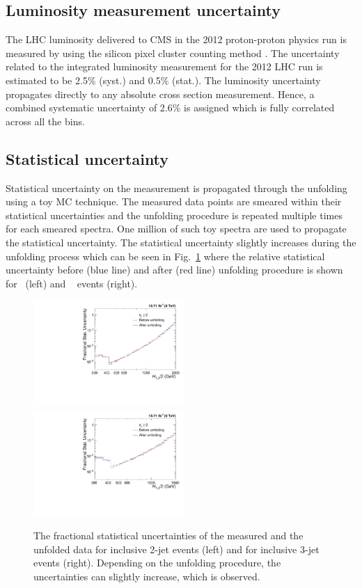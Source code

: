  \subsection{Luminosity measurement uncertainty}
The LHC luminosity delivered to CMS in the 2012 proton-proton physics run is measured  by using the silicon pixel cluster counting method \cite{CMS:2013gfa}. The uncertainty related to the integrated luminosity measurement for the 2012 LHC run is estimated to be 2.5\% (syst.) and 0.5\% (stat.). The luminosity uncertainty propagates directly to any absolute cross section measurement. Hence, a combined systematic uncertainty of 2.6\% is assigned which is fully correlated across all the \httwo bins. 

\subsection{Statistical uncertainty}
\label{sec:unfolding_stat}
Statistical uncertainty on the measurement is propagated through the unfolding using a toy MC technique. The measured data points are smeared within their statistical uncertainties and the unfolding procedure is repeated multiple times for each smeared spectra. One million of such toy spectra are used to propagate the statistical uncertainty. The statistical uncertainty slightly increases during the unfolding process which can be seen in Fig.~\ref{fig:stat_unc} where the relative statistical uncertainty before (blue line) and after (red line) unfolding procedure is shown for \njt~(left) and \njth~ events (right). 

\begin{figure}[h]
 \begin{center}
 \includegraphics[width=0.51\textwidth]{Plots_HT_2_150/Comparison_stat_unc_2_HT_2_150.pdf}%
 ~~\includegraphics[width=0.51\textwidth]{Plots_HT_2_150/Comparison_stat_unc_3_HT_2_150.pdf}
 \caption{The fractional statistical uncertainties of the measured and the unfolded data for inclusive 2-jet events (left) and for inclusive 3-jet events (right). Depending on the unfolding procedure, the uncertainties can slightly increase, which is observed.}
 \label{fig:stat_unc}
 \end{center}
\end{figure}


